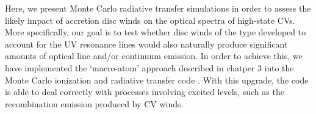 

\nocite{groot2004}
\nocite{beuermann1990}
\nocite{beuermann1992}
\nocite{higginbottom2013}

Here, we present Monte Carlo radiative transfer simulations in
order to assess the likely impact of accretion disc winds on the
optical spectra of high-state CVs. More specifically, our goal is to
test whether disc winds of the type developed to account for the UV
resonance lines would also naturally produce significant amounts of  
optical line and/or continuum emission. In order to achieve this, we
have implemented the `macro-atom' approach described in chatper 3 
into the Monte Carlo ionization and radiative transfer code \py. 
With this upgrade, the code is able to deal correctly with processes involving
excited levels, such as the recombination emission produced by CV
winds.


